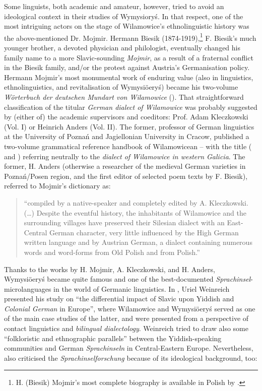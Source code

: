 \documentclass[output=paper]{langscibook}
\begin{document}
Some linguists, both academic and amateur, however, tried to avoid an ideological context in their studies of Wymysioryś. In that respect, one of the most intriguing actors on the stage of Wilamowice’s ethnolinguistic history was the above-mentioned Dr. Mojmir. Hermann Biesik (1874-1919),\footnote{H. (Biesik) Mojmir’s most complete biography is available in Polish by \citet{krol_hermann_2020}.} F. Biesik’s much younger brother, a devoted physician and philologist, eventually changed his family name to a more Slavic-sounding \textit{Mojmir}, as a result of a fraternal conflict in the Biesik family, and/or the protest against Austria’s Germanisation policy. Hermann Mojmir’s most monumental work of enduring value (also in linguistics, ethnolinguistics, and revitalisation of Wymysiöeryś) became his two-volume \textit{Wörterbuch der deutschen Mundart von Wilamowice} (\citeyear{mojmir_worterbuch}). That straightforward classification of the titular \textit{German dialect of Wilamowice} was probably suggested by (either of) the academic supervisors and coeditors: Prof. Adam Kleczkowski (Vol. I) or Heinrich Anders (Vol. II). The former, professor of German linguistics at the University of Poznań and Jagiellonian University in Cracow, published a two-volume grammatical reference handbook of Wilamowicean – with the title (\citealt{kleczkowski_dialekt_1920} and \citeyear{kleczkowski_dialekt_1921}) referring neutrally to the \textit{dialect of Wilamowice in western Galicia}. The former, H. Anders (otherwise a researcher of the medieval German varieties in Poznań/Posen region, and the first editor of selected poem texts by F. Biesik), referred to Mojmir’s dictionary as:

\begin{quote}
    “compiled by a native-speaker and completely edited by A. Kleczkowski. (\ldots) Despite the eventful history, the inhabitants of Wilamowice and the surrounding villages have preserved their Silesian dialect with an East-Central German character, very little influenced by the High German written language and by Austrian German, a dialect containing numerous words and word-forms from Old Polish and from Polish.” 
\end{quote}

Thanks to the works by H. Mojmir, A. Kleczkowski, and H. Anders, Wymysiöeryś became quite famous and one of the best-documented \textit{Sprachinsel}-microlan\-guages in the world of Germanic linguistics. In \citeyear{weinreich_yiddish_1958}, Uriel Weinreich presented his study on “the differential impact of Slavic upon Yiddish and \textit{Colonial German} in Europe”, where Wilamowice and Wymysiöeryś served as one of the main case studies of the latter, and were presented from a perspective of contact linguistics and \textit{bilingual dialectology}. Weinreich tried to draw also some “folkloristic and ethnographic parallels” between the Yiddish-speaking communities and German \textit{Sprachinseln} in Central-Eastern Europe. Nevertheless, \citet{weinreich_yiddish_1958} also criticised the \textit{Sprachinselforschung} because of its ideological background, too:
\end{document}

